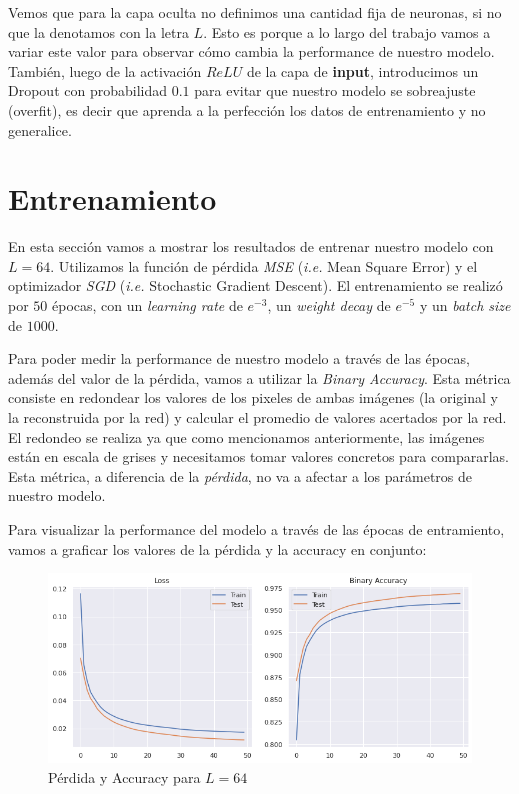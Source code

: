 \documentclass [a4paper,12pt,oneside,final]{article}
\begin{document}
Vemos que para la capa oculta no definimos una cantidad fija de neuronas, si no que la denotamos con la letra $L$. Esto es porque a lo largo del trabajo vamos a variar este valor para observar cómo cambia la performance de nuestro modelo. También, luego de la activación $ReLU$ de la capa de {\bf input}, introducimos un Dropout con probabilidad $0.1$ para evitar que nuestro modelo se sobreajuste (overfit), es decir que aprenda a la perfección los datos de entrenamiento y no generalice.

\section{Entrenamiento}

En esta sección vamos a mostrar los resultados de entrenar nuestro modelo con $L = 64$. Utilizamos la función de pérdida {\it MSE} ({\it i.e.} Mean Square Error) y el optimizador {\it SGD} ({\it i.e.} Stochastic Gradient Descent). El entrenamiento se realizó por $50$ épocas, con un {\it learning rate} de $e^{-3}$, un {\it weight decay} de $e^{-5}$ y un {\it batch size} de $1000$.

Para poder medir la performance de nuestro modelo a través de las épocas, además del valor de la pérdida, vamos a utilizar la {\it Binary Accuracy}. Esta métrica consiste en redondear los valores de los pixeles de ambas imágenes (la original y la reconstruida por la red) y calcular el promedio de valores acertados por la red. El redondeo se realiza ya que como mencionamos anteriormente, las imágenes están en escala de grises y necesitamos tomar valores concretos para compararlas. Esta métrica, a diferencia de la {\it pérdida}, no va a afectar a los parámetros de nuestro modelo.

Para visualizar la performance del modelo a través de las épocas de entramiento, vamos a graficar los valores de la pérdida y la accuracy en conjunto:

\begin{figure}[ht]
  \centering
  \includegraphics[width=15cm,keepaspectratio]{./graficos/training_metrics.png}
  \caption{Pérdida y Accuracy para $L=64$}\label{training_metrics}
\end{figure}
\end{document}
